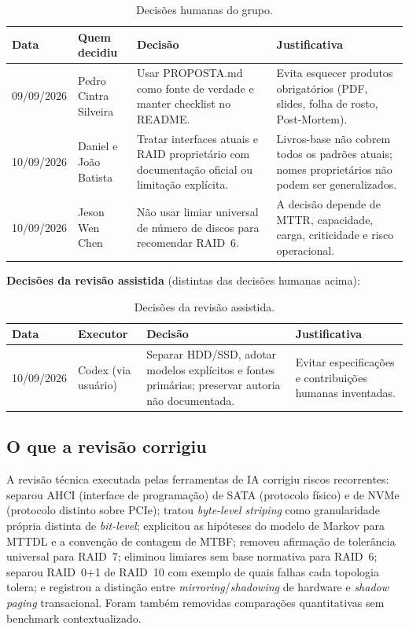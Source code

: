 \documentclass[titlepage]{article}
\begin{document}
\begin{table}[H]
    \centering
    \footnotesize
    \renewcommand{\arraystretch}{1.5}
    \begin{tabularx}{\textwidth}{|l|l|X|X|}
        \hline
        \textbf{Data} & \textbf{Quem decidiu} & \textbf{Decisão} & \textbf{Justificativa} \\
        \hline
        09/09/2026 & Pedro Cintra Silveira & Usar PROPOSTA.md como fonte de verdade e manter checklist no README. & Evita esquecer produtos obrigatórios (PDF, slides, folha de rosto, Post-Mortem). \\
        \hline
        10/09/2026 & Daniel e João Batista & Tratar interfaces atuais e RAID proprietário com documentação oficial ou limitação explícita. & Livros-base não cobrem todos os padrões atuais; nomes proprietários não podem ser generalizados. \\
        \hline
        10/09/2026 & Jeson Wen Chen & Não usar limiar universal de número de discos para recomendar RAID~6. & A decisão depende de MTTR, capacidade, carga, criticidade e risco operacional. \\
        \hline
    \end{tabularx}
    \caption{Decisões humanas do grupo.}
    \label{tab:decisoes_grupo}
\end{table}

\noindent\textbf{Decisões da revisão assistida} (distintas das decisões humanas acima):

\begin{table}[H]
    \centering
    \footnotesize
    \renewcommand{\arraystretch}{1.5}
    \begin{tabularx}{\textwidth}{|l|l|X|X|}
        \hline
        \textbf{Data} & \textbf{Executor} & \textbf{Decisão} & \textbf{Justificativa} \\
        \hline
        10/09/2026 & Codex (via usuário) & Separar HDD/SSD, adotar modelos explícitos e fontes primárias; preservar autoria não documentada. & Evitar especificações e contribuições humanas inventadas. \\
        \hline
    \end{tabularx}
    \caption{Decisões da revisão assistida.}
    \label{tab:decisoes_ia}
\end{table}

\subsection{O que a revisão corrigiu}
A revisão técnica executada pelas ferramentas de IA corrigiu riscos recorrentes: separou AHCI (interface de programação) de SATA (protocolo físico) e de NVMe (protocolo distinto sobre PCIe); tratou \textit{byte-level striping} como granularidade própria distinta de \textit{bit-level}; explicitou as hipóteses do modelo de Markov para MTTDL e a convenção de contagem de MTBF; removeu afirmação de tolerância universal para RAID~7; eliminou limiares sem base normativa para RAID~6; separou RAID~0+1 de RAID~10 com exemplo de quais falhas cada topologia tolera; e registrou a distinção entre \textit{mirroring}/\textit{shadowing} de hardware e \textit{shadow paging} transacional. Foram também removidas comparações quantitativas sem benchmark contextualizado.
\end{document}

